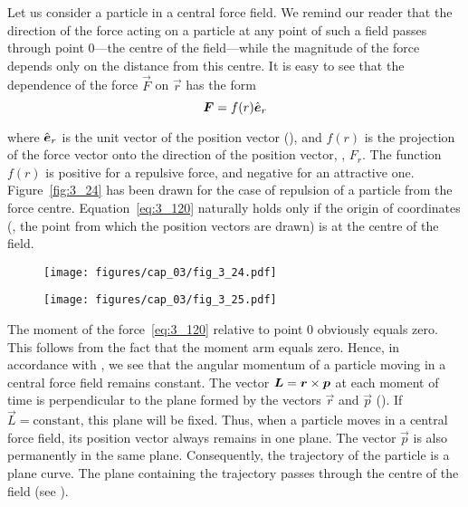 Let us consider a particle in a central force field. We remind our reader that the direction of the force acting on a particle at any point of such a field passes through point $0$---the centre of the field---while the magnitude of the force depends only on the distance from this centre. It is easy to see that the dependence of the force $\vec{F}$ on $\vec{r}$ has the form
\begin{equation}\label{eq:3_120}
\boldsymbol{F} = f(r) \hat{\boldsymbol{e}}_{r}
\end{equation}

\noindent
where $\hat{\boldsymbol{e}}_{r}$ is the unit vector of the position vector (), and $f(r)$ is the projection of the force vector onto the direction of the position vector, \ie, $F_r$. The function $f(r)$ is positive for a repulsive force, and negative for an attractive one. Figure~\ref{fig:3_24} has been drawn for the case of repulsion of a particle from the force centre. Equation~\eqref{eq:3_120} naturally holds only if the origin of coordinates (\ie, the point from which the position vectors are drawn) is at the centre of the field.

\begin{figure}[t]
	\hspace{-0.5cm}
	\begin{minipage}[t]{0.5\linewidth}
		\begin{center}
			\texttt{[image: figures/cap\_03/fig\_3\_24.pdf]}
			\caption[]{}
			\label{fig:3_24}
		\end{center}
	\end{minipage}
	\hspace{-0.5cm}
	\begin{minipage}[t]{0.5\linewidth}
		\begin{center}
			\texttt{[image: figures/cap\_03/fig\_3\_25.pdf]}
			\caption[]{}
			\label{fig:3_25}
		\end{center}
	\end{minipage}
	\vspace{-0.3cm}
\end{figure}

The moment of the force~\eqref{eq:3_120} relative to point $0$ obviously equals zero. This follows from the fact that the moment arm equals zero. Hence, in accordance with , we see that the angular momentum of a particle moving in a central force field remains constant. The vector $\boldsymbol{L}=\boldsymbol{r}\times\boldsymbol{p}$ at each moment of time is perpendicular to the plane formed by the vectors $\vec{r}$ and $\vec{p}$ (). If $\vec{L}=\text{constant}$, this plane will be fixed. Thus, when a particle moves in a central force field, its position vector always remains in one plane. The vector $\vec{p}$ is also permanently in the same plane. Consequently, the trajectory of the particle is a plane curve. The plane containing the trajectory passes through the centre of the field (see ).

